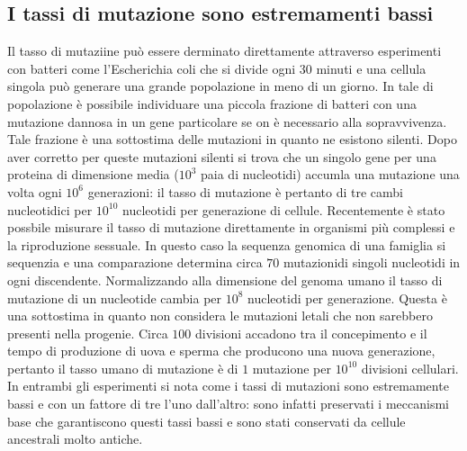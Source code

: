 \subsection{I tassi di mutazione sono estremamenti bassi}
Il tasso di mutaziine pu\`o essere derminato direttamente attraverso esperimenti con batteri come l'Escherichia coli che si divide ogni $30$ minuti e una cellula singola pu\`o generare
una grande popolazione in meno di un giorno. In tale di popolazione \`e possibile individuare una piccola frazione di batteri con una mutazione dannosa in un gene particolare se on
\`e necessario alla sopravvivenza. Tale frazione \`e una sottostima delle mutazioni in quanto ne esistono silenti. Dopo aver corretto per queste mutazioni silenti si trova che un singolo
gene per una proteina di dimensione media ($10^3$ paia di nucleotidi) accumla una mutazione una volta ogni $10^6$ generazioni: il tasso di mutazione \`e pertanto di tre cambi 
nucleotidici per $10^{10}$ nucleotidi per generazione di cellule. Recentemente \`e stato possbile misurare il tasso di mutazione direttamente in organismi pi\`u complessi e la 
riproduzione sessuale. In questo caso la sequenza genomica di una famiglia si sequenzia e una comparazione determina circa $70$ mutazionidi singoli nucleotidi in ogni discendente. 
Normalizzando alla dimensione del genoma umano il tasso di mutazione di un nucleotide cambia per $10^8$ nucleotidi per generazione. Questa \`e una sottostima in quanto non considera le 
mutazioni letali che non sarebbero presenti nella progenie. Circa $100$ divisioni accadono tra il concepimento e il tempo di produzione di uova e sperma che producono una nuova 
generazione, pertanto il tasso umano di mutazione \`e di $1$ mutazione per $10^{10}$ divisioni cellulari. In entrambi gli esperimenti si nota come i tassi di mutazioni sono estremamente
bassi e con un fattore di tre l'uno dall'altro: sono infatti preservati i meccanismi base che garantiscono questi tassi bassi e sono stati conservati da cellule ancestrali molto antiche.

